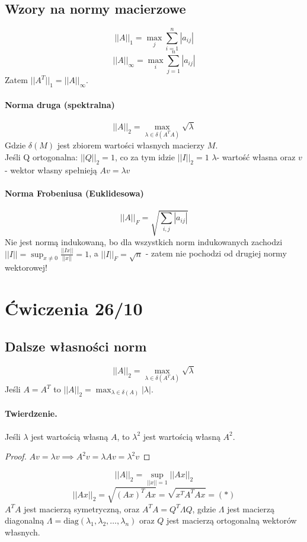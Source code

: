 \documentclass{article}
\begin{document}
\subsection{Wzory na normy macierzowe}
$$ ||A||_1=\max_j\sum_{i=1}^{n} |a_{ij}|$$
$$ ||A||_\infty=\max_i\sum_{j=1}^{n} |a_{ij}|$$
Zatem $ ||A^T||_1=||A||_\infty $.\\
\paragraph{Norma druga (spektralna)}
$$||A||_2=\max_{\lambda\in\delta(A^TA)}\sqrt{\lambda}$$
Gdzie $ \delta(M) $ jest zbiorem wartości własnych macierzy $ M $.\\
Jeśli Q ortogonalna: $||Q||_2=1$, co za tym idzie $ ||I||_2=1 $
$ \lambda $- wartość własna oraz $ v $ - wektor własny spełnieją $ Av=\lambda v $
\paragraph{Norma Frobeniusa (Euklidesowa)}
$$ ||A||_F = \sqrt{\sum_{i,j}|a_{ij}|} $$
Nie jest normą indukowaną, bo dla wszystkich norm indukowanych zachodzi $ ||I||=\sup_{x\not=0}\frac{||Ix||}{||x||}=1 $, a
$ ||I||_F=\sqrt{n} $ - zatem nie pochodzi od drugiej normy wektorowej!

\section{Ćwiczenia 26/10}
\subsection{Dalsze własności norm}
$$ ||A||_2=\max_{\lambda\in\delta(A^TA)}\sqrt{\lambda} $$
Jeśli $ A=A^T $ to $ ||A||_2=\max_{\lambda\in\delta(A)}|\lambda| $. 
\paragraph{Twierdzenie.} Jeśli $ \lambda $ jest wartością własną $ A $, to $ \lambda^2 $ jest wartością własną $ A^2 $.\begin{proof}
	$Av=\lambda v \implies A^2v=\lambda Av=\lambda^2v$
\end{proof}
$$ ||A||_2=\sup_{||x||=1}||Ax||_2 $$
$$||Ax||_2=\sqrt{(Ax)^TAx}=\sqrt{x^TA^TAx}=(*)$$
$ A^TA $ jest macierzą symetryczną, oraz $ A^TA=Q^T\Lambda Q $, gdzie $ \Lambda $ jest macierzą diagonalną $ \Lambda=\text{diag}(\lambda_1, \lambda_2, \ldots, \lambda_n) $ oraz $ Q $ jest macierzą ortogonalną wektorów własnych.
\end{document}
